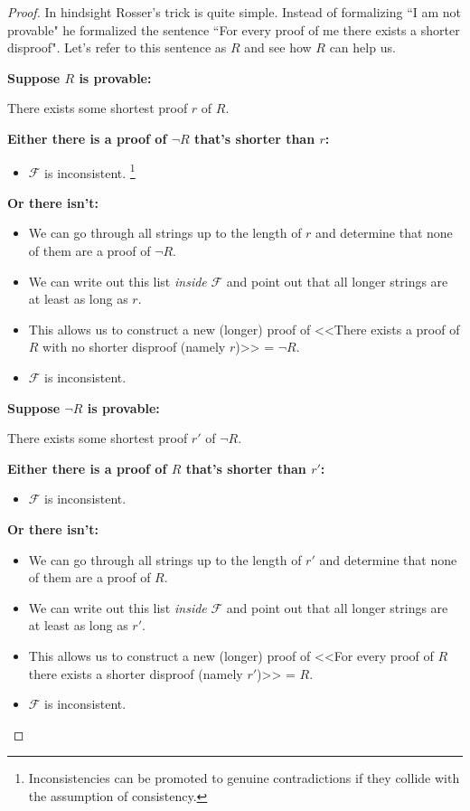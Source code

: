 \documentclass{article}
\theoremstyle{theorem}
\newcommand{\nameditem}[1]{\item\textbf{#1}}
\newcommand{\impl}{\item[$\Rightarrow$]}
\begin{document}
\begin{proof}
In hindsight Rosser's trick is quite simple. Instead of formalizing ``I am not provable" he formalized the sentence ``For every proof of me there exists a shorter disproof". Let's refer to this sentence as $R$ and see how $R$ can help us.
\begin{description}
\nameditem{Suppose $R$ is provable:}
\begin{description}
\impl There exists some shortest proof $r$ of $R$.
\nameditem{Either there is a proof of $\neg R$ that's shorter than $r$:}
\begin{itemize}
\impl $\mathcal{F}$ is inconsistent. \lightning\footnote{Inconsistencies can be promoted to genuine contradictions if they collide with the assumption of consistency.}
\end{itemize}
\nameditem{Or there isn't:}
\begin{itemize}
\impl We can go through all strings up to the length of $r$ and determine that none of them are a proof of $\neg R$.
\impl We can write out this list \textit{inside} $\mathcal{F}$ and point out that all longer strings are at least as long as $r$.
\impl This allows us to construct a new (longer) proof of <<There exists a proof of $R$ with no shorter disproof (namely $r$)>> = $\neg R$.
\impl $\mathcal{F}$ is inconsistent. \lightning
\end{itemize}
\end{description}
\nameditem{Suppose $\neg R$ is provable:}
\begin{description}
\impl There exists some shortest proof $r'$ of $\neg R$.
\nameditem{Either there is a proof of $R$ that's shorter than $r'$:}
\begin{itemize}
\impl $\mathcal{F}$ is inconsistent. \lightning
\end{itemize}
\nameditem{Or there isn't:}
\begin{itemize}
\impl We can go through all strings up to the length of $r'$ and determine that none of them are a proof of $R$.
\impl We can write out this list \textit{inside} $\mathcal{F}$ and point out that all longer strings are at least as long as $r'$.
\impl This allows us to construct a new (longer) proof of <<For every proof of $R$ there exists a shorter disproof (namely $r'$)>> = $R$.
\impl $\mathcal{F}$ is inconsistent. \lightning
\end{itemize}
\end{description}
\end{description}
\end{proof}
\end{document}
